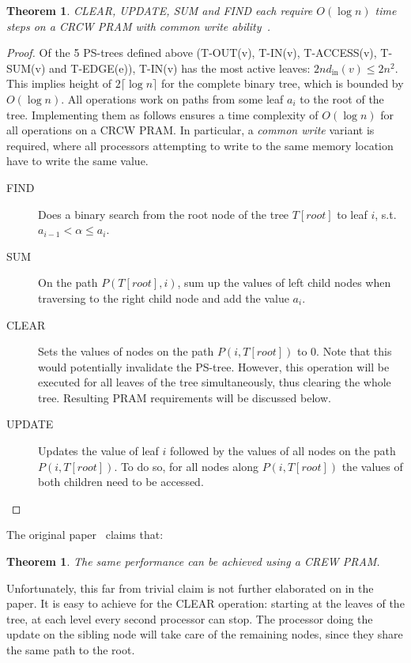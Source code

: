 \documentclass[a4paper,10pt, twocolumn]{article}
\newtheorem{theorem}[lemma]{Theorem}
\begin{document}
\begin{theorem}
CLEAR, UPDATE, SUM and FIND each require $O(\log n)$ time steps on a CRCW PRAM with common write ability~\cite{yossi81}.
\end{theorem}
\begin{proof}
Of the 5 PS-trees defined above (T-OUT(v), T-IN(v), T-ACCESS(v), T-SUM(v) and T-EDGE(e)), T-IN(v) has the most active leaves: $2nd_{\mathrm{in}}(v) \leq 2n^2$. This implies height of $2 \lceil \log n \rceil$ for the complete binary tree, which is bounded by $O(\log n)$. All operations work on paths from some leaf $a_i$ to the root of the tree. Implementing them as follows ensures a time complexity of $O(\log n)$ for all operations on a CRCW PRAM. In particular, a \emph{common write} variant is required, where all processors attempting to write to the same memory location have to write the same value.
\begin{description}
	\item [FIND] Does a binary search from the root node of the tree $T[root]$ to leaf $i$, s.t. $a_{i-1} < \alpha \leq a_i$. 
	\item [SUM] On the path $P(T[root], i)$, sum up the values of left child nodes when traversing to the right child node and add the value $a_i$.
	\item [CLEAR] Sets the values of nodes on the path $P(i, T[root])$ to 0. Note that this would potentially invalidate the PS-tree. However, this operation will be executed for all leaves of the tree simultaneously, thus clearing the whole tree. Resulting PRAM requirements will be discussed below.
	\item [UPDATE] Updates the value of leaf $i$ followed by the values of all nodes on the path $P(i, T[root])$. To do so, for all nodes along $P(i, T[root])$ the values of both children need to be accessed.
\end{description}
\end{proof}

The original paper~\cite{yossi81} claims that:
\begin{theorem}
The same performance can be achieved using a CREW PRAM.
\end{theorem}

Unfortunately, this far from trivial claim is not further elaborated on in the paper. It is easy to achieve for the CLEAR operation: starting at the leaves of the tree, at each level every second processor can stop. The processor doing the update on the sibling node will take care of the remaining nodes, since they share the same path to the root. 
\end{document}
